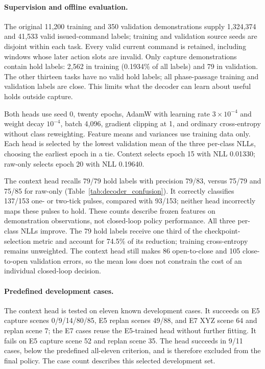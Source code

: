 \paragraph{Supervision and offline evaluation.}
The original 11,200 training and 350 validation demonstrations supply
1,324,374 and 41,533 valid issued-command labels; training and validation
source seeds are disjoint within each task. Every valid current command is retained, including windows whose
later action slots are invalid. Only capture demonstrations contain hold
labels: 2,562 in training (0.1934\% of all labels) and 79 in validation.
The other thirteen tasks have no valid hold labels; all phase-passage
training and validation labels are close. This limits what the decoder
can learn about useful holds outside capture.

Both heads use seed 0, twenty epochs, AdamW with learning rate
$3\!\times\!10^{-4}$ and weight decay $10^{-4}$, batch 4,096, gradient
clipping at 1, and ordinary cross-entropy without class reweighting.
Feature means and variances use training data only. Each head is selected
by the lowest validation mean of the three per-class NLLs, choosing the
earliest epoch in a tie. Context selects epoch 15 with NLL 0.01330;
raw-only selects epoch 20 with NLL 0.19640.


The context head recalls 79/79 hold labels with precision 79/83, versus
75/79 and 75/85 for raw-only (Table~\ref{tab:decoder_confusion}). It correctly
classifies 137/153 one- or two-tick pulses, compared with 93/153; neither
head incorrectly maps these pulses to hold. These counts describe frozen
features on demonstration observations, not closed-loop policy performance.
All three per-class NLLs improve. The 79 hold labels receive one third of
the checkpoint-selection metric and account for 74.5\% of its reduction;
training cross-entropy remains unweighted. The context head still makes
86 open-to-close and 105 close-to-open validation errors, so the mean loss
does not constrain the cost of an individual closed-loop decision.

\paragraph{Predefined development cases.}
The context head is tested on eleven known development cases. It succeeds
on E5 capture scenes 0/9/14/80/85, E5 replan scenes 49/88, and E7 XYZ scene
64 and replan scene 7; the E7 cases reuse the E5-trained head without
further fitting. It fails on E5 capture scene 52 and replan scene 35.
The head succeeds in 9/11 cases, below the predefined all-eleven
criterion, and is therefore excluded from the final policy. The case count
describes this selected development set.

